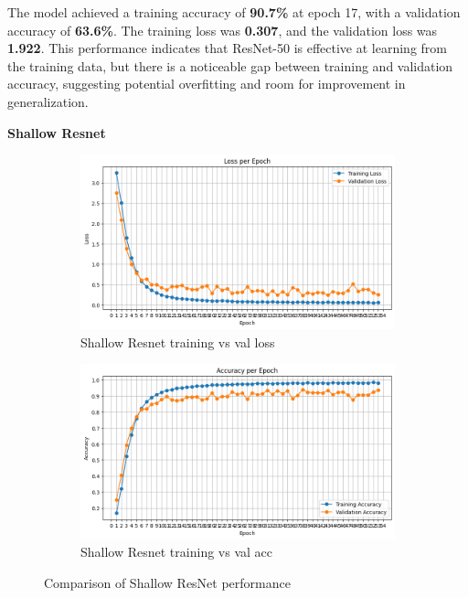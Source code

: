 \documentclass[12pt]{article}
\begin{document}
The model achieved a training accuracy of \textbf{90.7\%} at epoch 17, with a validation accuracy of \textbf{63.6\%}. The training loss was \textbf{0.307}, and the validation loss was \textbf{1.922}. This performance indicates that ResNet-50 is effective at learning from the training data, but there is a noticeable gap between training and validation accuracy, suggesting potential overfitting and room for improvement in generalization.



\textbf{Shallow Resnet}



\begin{figure}[ht]
    \centering
    \begin{subfigure}{0.45\linewidth}
        \centering
        \includegraphics[width=\linewidth]{t3_sh_res_loss.png}
        \caption{Shallow Resnet training vs val loss}
        \label{fig:t3_sh_res_loss}
    \end{subfigure}
    \hfill
    \begin{subfigure}{0.45\linewidth}
        \centering
        \includegraphics[width=\linewidth]{t3_sh_res_acc.png}
        \caption{Shallow Resnet training vs val acc}
        \label{fig:t3_sh_res_acc}
    \end{subfigure}
    \caption{Comparison of Shallow ResNet performance}
    \label{fig:t3_sh_res_performance}
\end{figure}
\end{document}

